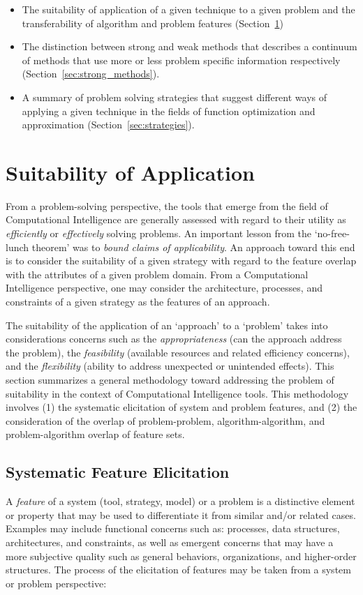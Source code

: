 \documentclass[a4paper, 11pt]{article}
\begin{document}
\begin{itemize} 
  \item The suitability of application of a given technique to a given problem and the transferability of algorithm and problem features (Section~\ref{sec:suitability})
  \item The distinction between strong and weak methods that describes a continuum of methods that use more or less problem specific information respectively (Section~\ref{sec:strong_methods}).
	\item A summary of problem solving strategies that suggest different ways of applying a given technique in the fields of function optimization and approximation (Section~\ref{sec:strategies}).
\end{itemize}

%
%
\section{Suitability of Application}
\label{sec:suitability}
From a problem-solving perspective, the tools that emerge from the field of Computational Intelligence are generally assessed with regard to their utility as \emph{efficiently} or \emph{effectively} solving problems.
An important lesson from the `no-free-lunch theorem' was to \emph{bound claims of applicability}. An approach toward this end is to consider the suitability of a given strategy with regard to the feature overlap with the attributes of a given problem domain. From a Computational Intelligence perspective, one may consider the architecture, processes, and constraints of a given strategy as the features of an approach. 

The suitability of the application of an `approach' to a `problem' takes into considerations concerns such as the \emph{appropriateness} (can the approach address the problem), the \emph{feasibility} (available resources and related efficiency concerns), and the \emph{flexibility} (ability to address unexpected or unintended effects).
This section summarizes a general methodology toward addressing the problem of suitability in the context of Computational Intelligence tools. This methodology involves (1) the systematic elicitation of system and problem features, and (2) the consideration of the overlap of problem-problem, algorithm-algorithm, and problem-algorithm overlap of feature sets. 

\subsection{Systematic Feature Elicitation}
A \emph{feature} of a system (tool, strategy, model) or a problem is a distinctive element or property that may be used to differentiate it from similar and/or related cases. Examples may include functional concerns such as: processes, data structures, architectures, and constraints, as well as emergent concerns that may have a more subjective quality such as general behaviors, organizations, and higher-order structures. The process of the elicitation of features may be taken from a system or problem perspective:
\end{document}
